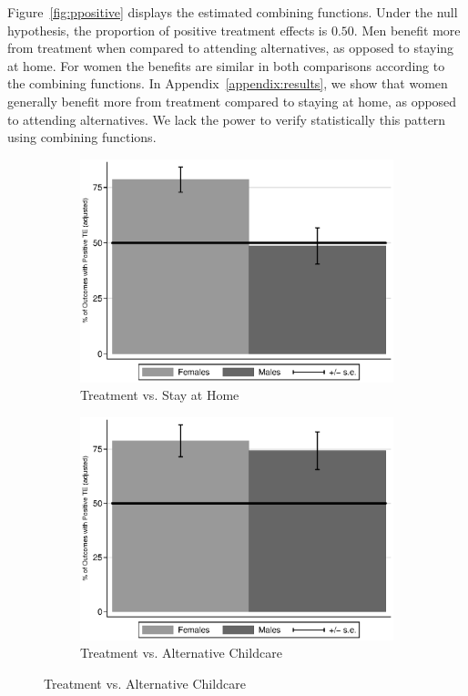 Figure~\ref{fig:ppositive} displays the estimated combining functions. Under the null hypothesis, the proportion of positive treatment effects is $0.50$. Men benefit more from treatment when compared to attending alternatives, as opposed to staying at home. For women the benefits are similar in both comparisons according to the combining functions. In Appendix~\ref{appendix:results}, we show that women generally benefit more from treatment compared to staying at home, as opposed to attending alternatives. We lack the power to verify statistically this pattern using combining functions. 


\begin{figure}
\centering
\caption{Positively Impacted Outcomes, ABC/CARE Males and Females}\label{fig:ppositive}
\begin{subfigure}[h]{0.49\textwidth}
		\centering
		\caption{ Treatment vs. Stay at Home} \label{fig:ppositivehome}
		\includegraphics[width=\textwidth]{output/epan_ipw_p0_all.eps}
\end{subfigure}%
\begin{subfigure}[h]{0.49\textwidth}
	\centering
	\caption{Treatment vs. Alternative Childcare} \label{fig:ppositivealternative}
		\includegraphics[width=\textwidth]{output/epan_ipw_p1_all.eps}

\end{subfigure}
\end{figure}
